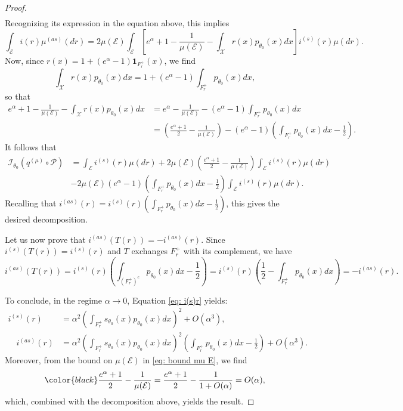 \documentclass[a4paper, 11pt]{article}
\theoremstyle{definition}
\newcommand{\modar}{\color{black}}
\begin{document}
{\begin{proof}
\begin{align*}
\end{align*}
Recognizing its expression in the equation above, this implies
\[
\int_{\mathcal{E}} i(r) \mu^{(as)}(dr) = 2 \mu(\mathcal{E}) \int_{\mathcal{E}} \left[ e^\alpha + 1 - \frac{1}{\mu(\mathcal{E})} - \int_{\mathcal{X}} r(x) p_{\theta_0}(x) dx \right] i^{(s)}(r) \mu(dr).
\]
Now, since \( r(x) = 1 + (e^\alpha - 1)\mathbf{1}_{F_r^+}(x) \), we find
\[
\int_\mathcal{X} r(x) p_{\theta_0}(x) dx = 1 + (e^\alpha - 1)\int_{F_r^+} p_{\theta_0}(x) dx,
\]
so that
\begin{align*}
e^\alpha + 1 - \frac{1}{\mu(\mathcal{E})} - \int_\mathcal{X} r(x) p_{\theta_0}(x) dx &= e^\alpha - \frac{1}{\mu(\mathcal{E})} - (e^\alpha - 1)\int_{F_r^+} p_{\theta_0}(x) dx \\
&= \left( \frac{e^\alpha + 1}{2} - \frac{1}{\mu(\mathcal{E})} \right) - (e^\alpha - 1)\left( \int_{F_r^+} p_{\theta_0}(x) dx - \frac{1}{2} \right).    
\end{align*}
It follows that
\begin{align*}
\mathcal{I}_{\theta_0}(q^{(\mu)} \circ \mathcal{P})& = \int_{\mathcal{E}} i^{(s)}(r) \mu(dr) + 2 \mu(\mathcal{E}) \left( \frac{e^\alpha + 1}{2} - \frac{1}{\mu(\mathcal{E})} \right) \int_{\mathcal{E}} i^{(s)}(r) \mu(dr) \\
& - 2 \mu(\mathcal{E})(e^\alpha - 1)\left( \int_{F_r^+} p_{\theta_0}(x) dx - \frac{1}{2} \right) \int_{\mathcal{E}} i^{(s)}(r) \mu(dr).
\end{align*}
Recalling that \( i^{(as)}(r) = i^{(s)}(r) \left( \int_{F_r^+} p_{\theta_0}(x) dx - \frac{1}{2} \right) \), this gives the desired decomposition.

Let us now prove that \( i^{(as)}(T(r)) = -i^{(as)}(r) \). Since \( i^{(s)}(T(r)) = i^{(s)}(r) \) and \( T \) exchanges \( F_r^+ \) with its complement, we have
\[
i^{(as)}(T(r)) = i^{(s)}(r) \left( \int_{(F_r^+)^c} p_{\theta_0}(x) dx - \frac{1}{2} \right) = i^{(s)}(r) \left(\frac{1}{2} - \int_{F_r^+} p_{\theta_0}(x) dx \right) = - i^{(as)}(r).
\]

To conclude, in the regime \( \alpha \to 0 \), Equation \eqref{eq: i(s)r} yields:
{\modar
	\begin{align*}
 i^{(s)}(r) &= \alpha^2 \left( \int_{F_r^+} s_{\theta_0}(x) p_{\theta_0}(x) dx \right)^2 + O(\alpha^3),
\\ 
\quad i^{(as)}(r) &=\alpha^2 \left( \int_{F_r^+} s_{\theta_0}(x) p_{\theta_0}(x) dx \right)^2 \left( \int_{F_r^+} p_{\theta_0}(x) dx - \frac{1}{2} \right)+O(\alpha^3).
\end{align*}}
Moreover, from the bound on \( \mu(\mathcal{E}) \) in \eqref{eq: bound mu E}, we find
\[{\modar
\frac{e^\alpha + 1}{2} - \frac{1}{\mu(\mathcal{E})} 
=\frac{e^\alpha + 1}{2} - \frac{1}{1+O(\alpha)}=O(\alpha), }
\]
which, combined with the decomposition above, yields the result.
\end{proof}


}
\end{document}
